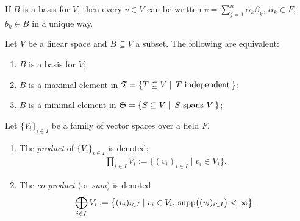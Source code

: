     \begin{corollary}
        If $B$ is a basis for $V$, then every $v \in V$ can be written $v = \sum_{j = 1}^n \alpha_k \beta_k$, $\alpha_k \in F$, $b_k \in B$ in a unique way.
    \end{corollary}

    \begin{theorem}
        Let $V$ be a linear space and $B \subseteq V$ a subset. The following are equivalent:
            \begin{enumerate}[label = (\arabic*),itemsep=1pt,topsep=3pt]
                \item $B$ is a basis for $V$;
                \item $B$ is a maximal element in $\fT = \{T \subseteq V \mid \hspace{-4pt}\mtext{$T$ independent}\hspace{-4pt}\}$;
                \item $B$ is a minimal element in $\fS = \{S \subseteq V \mid \hspace{-4pt}\mtext{$S$ spans $V$}\hspace{-4pt}\}$;
            \end{enumerate}
    \end{theorem}

    \begin{definition}
        Let $\{V_i\}_{i \in I}$ be a family of vector spaces over a field $F$.
            \begin{enumerate}[label = (\arabic*),itemsep=1pt,topsep=3pt]
                \item The \textit{product} of $\{V_i\}_{i \in I}$ is denoted:
                    \begin{equation*}
                    \begin{split}
                        \prod_{i \in I}V_i := \{(v_i)_{i \in I} \mid v_i \in V_i\}.
                    \end{split}
                    \end{equation*}
                \item The \textit{co-product} (or \textit{sum}) is denoted 
                    \begin{equation*}
                    \begin{split}
                        \bigoplus_{i \in I}V_i := \left\{(v_i)_{i \in I} \mid v_i \in V_i,\hspace{2pt} \operatorname{supp}\bigl((v_i)_{i \in I}\bigr) <\infty \right\}.
                    \end{split}
                    \end{equation*}
            \end{enumerate}
    \end{definition}
    
